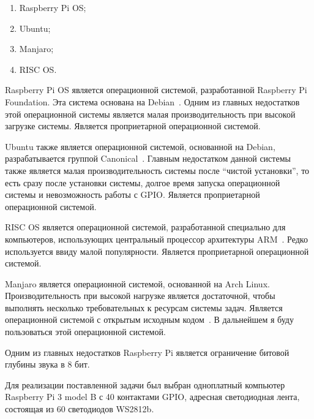 \begin{enumerate}
  \item Raspberry Pi OS;
  \item Ubuntu;
  \item Manjaro;
  \item RISC OS.
\end{enumerate}

Raspberry Pi OS является операционной системой, разработанной Raspberry Pi Foundation. Эта система основана на Debian~\cite{rpi-site}. Одним из главных недостатков этой операционной системы является малая производительность при высокой загрузке системы. Является проприетарной операционной системой.

Ubuntu также является операционной системой, основанной на Debian, разрабатывается группой Canonical~\cite{ubuntu}. Главным недостатком данной системы также является малая производительность системы после ``чистой установки'', то есть сразу после установки системы,  долгое время запуска операционной системы и невозможность работы с GPIO. Является проприетарной операционной системой.

RISC OS является операционной системой, разработанной специально для компьютеров, использующих центральный процессор архитектуры ARM~\cite{risc-os}. Редко используется ввиду малой популярности. Является проприетарной операционной системой.

Manjaro является операционной системой, основанной на Arch Linux. Производительность при высокой нагрузке является достаточной, чтобы выполнять несколько требовательных к ресурсам системы задач. Является операционной системой с открытым исходным кодом~\cite{manjaro}. В дальнейшем я буду пользоваться этой операционной системой.

Одним из главных недостатков Raspberry Pi является ограничение битовой глубины звука в 8 бит.

Для реализации поставленной задачи был выбран одноплатный компьютер Raspberry Pi 3 model B с 40 контактами GPIO, адресная светодиодная лента, состоящая из 60 светодиодов WS2812b.